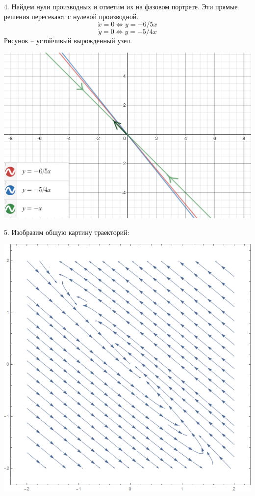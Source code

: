 \documentclass[10pt]{report}
\begin{document}
4. Найдем нули производных и отметим их на фазовом портрете. Эти прямые решения пересекают с нулевой производной. \[ \dot{x}=0 \Leftrightarrow y=-6/5x\]
\[ \dot{y}=0 \Leftrightarrow y=-5/4x\]
Рисунок -- устойчивый вырожденный узел.
\begin{center}
{\includegraphics[scale=0.4]{graph8.1.png}} 
\end{center}

5. Изобразим общую картину траекторий:

\begin{center}
{\includegraphics[scale=0.5]{graph8.2.png}} 
\end{center}
\end{document}

